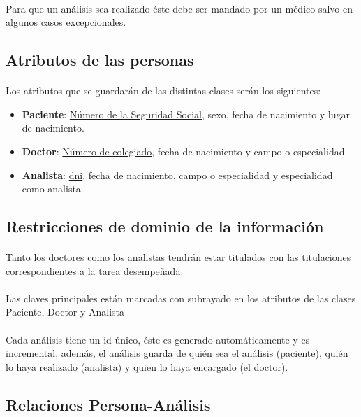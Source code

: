 \documentclass[a4paper,10pt]{article}
\begin{document}
\paragraph{}
Para que un análisis sea realizado éste debe ser mandado por un médico salvo en algunos casos excepcionales.
\subsection{Atributos de las personas}

\paragraph{}
Los atributos que se guardarán de las distintas clases serán los siguientes:
\begin{itemize}
	\item {\bf Paciente}: \underline{Número de la Seguridad Social}, sexo, fecha de nacimiento y lugar de nacimiento.
	\item {\bf Doctor}: \underline{Número de colegiado}, fecha de nacimiento y campo o especialidad.
	\item {\bf Analista}: \underline{dni}, fecha de nacimiento, campo o especialidad y especialidad como analista.
\end{itemize}
\pagebreak
\subsection{Restricciones de dominio de la información}

\paragraph{}
Tanto los doctores como los analistas tendrán estar titulados con las titulaciones correspondientes a la tarea desempeñada.
\paragraph{}
Las claves principales están marcadas con subrayado en los atributos de las clases Paciente, Doctor y Analista
\paragraph{}
Cada análisis tiene un id único, éste es generado automáticamente y es incremental, además, el análisis guarda de quién sea el análisis (paciente), quién lo haya realizado (analista) y quien lo haya encargado (el doctor).
\subsection{Relaciones Persona-Análisis}
\end{document}

